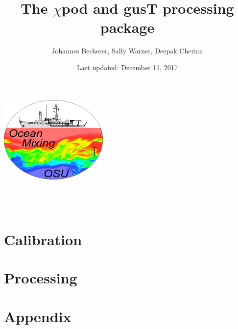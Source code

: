 \documentclass[12pt]{report}
\title{The $\chi$pod and gusT processing package}
\author{Johannes Becherer, Sally Warner, Deepak Cherian}
\date{Last updated: December 11, 2017}
\makeatletter
\def\makenewtitle{{
\thispagestyle{plain}
\centering
\includegraphics[width=0.4\textwidth]{figs/omg_logo.png} \\[23ex]
\vspace*{\fill}
{\Huge \@title }\\[4ex]
{\large  \@author}\\[4ex]
\@date\\
\vspace*{\fill}}}
\makeatother
\begin{document}
\pagestyle{fancy}

\makenewtitle
\tableofcontents

\part{Calibration}



\part{Processing}





\appendix
\part{Appendix}




\end{document}

